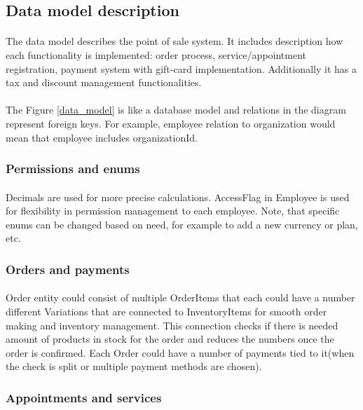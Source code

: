 \documentclass{article}
\begin{document}
    \subsection{Data model description}
    \paragraph{}The data model describes the point of sale system. It includes description how each functionality is implemented: order process, service/appointment registration, payment system with gift-card implementation. Additionally it has a tax and discount management functionalities. 
    \paragraph{}The Figure \ref{data_model} is like a database model and relations in the diagram represent foreign keys. For example, employee relation to organization would mean that employee includes organizationId.
    \subsubsection{Permissions and enums}
    \paragraph{}Decimals are used for more precise calculations. AccessFlag in Employee is used for flexibility in permission management to each employee. Note, that specific enums can be changed based on need, for example to add a new currency or plan, etc.
    \subsubsection{Orders and payments}
    \paragraph{}Order entity could consist of multiple OrderItems that each could have a number different Variations that are connected to InventoryItems for smooth order making and inventory management. This connection checks if there is needed amount of products in stock for the order and reduces the numbers once the order is confirmed. Each Order could have a number of payments tied to it(when the check is split or multiple payment methods are chosen).
    \subsubsection{Appointments and services}
\end{document}
